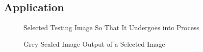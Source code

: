 \documentclass[oneside,a4paper,12pt]{report}
\begin{document}
\begin{center}
\begin{enumerate}
\chapter{Application}
\begin{center}
\begin{figure}[!htbp]
\caption{Selected Testing Image So That It Undergoes into Process}
\end{figure}
\end{center}
\begin{center}
\begin{figure}[!htbp]
\caption{Grey Scaled Image Output of a Selected Image}

\end{figure}
\end{center}
\end{enumerate}
\end{center}
\end{document}
